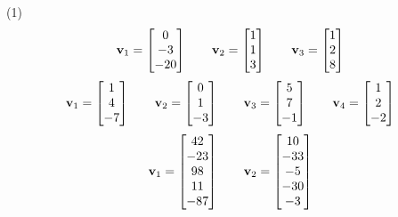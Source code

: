 \begin{tasks}[resume, style=enumerate](1)
\task
  \begin{displaymath}
    \mathbf v_1 = \begin{bmatrix} 0 \\ -3 \\ -20 \end{bmatrix}
    \qquad
    \mathbf v_2 = \begin{bmatrix} 1 \\ 1 \\ 3 \end{bmatrix}
    \qquad
    \mathbf v_3 = \begin{bmatrix} 1 \\ 2 \\ 8 \end{bmatrix}
  \end{displaymath}
\task
  \begin{displaymath}
    \mathbf v_1 = \begin{bmatrix} 1 \\ 4 \\ -7 \end{bmatrix}
    \qquad
    \mathbf v_2 = \begin{bmatrix} 0 \\ 1 \\ -3 \end{bmatrix}
    \qquad
    \mathbf v_3 = \begin{bmatrix} 5 \\ 7 \\ -1 \end{bmatrix}
    \qquad
    \mathbf v_4 = \begin{bmatrix} 1 \\ 2 \\ -2 \end{bmatrix}
  \end{displaymath}
\task \faCalculator
  \begin{align*}
    \vv_1
    = \begin{bmatrix} 42 \\ -23 \\ 98 \\ 11 \\ -87 \end{bmatrix}
    \qquad
    \vv_2
    = \begin{bmatrix} 10 \\ -33 \\ -5 \\ -30 \\ -3 \end{bmatrix}

\end{align*}
\end{tasks}
